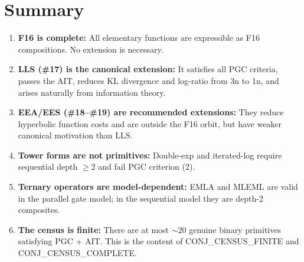 \documentclass[11pt]{article}
\begin{document}
\section{Summary}
\label{sec:summary}

\begin{enumerate}
  \item \textbf{F16 is complete:} All elementary functions are expressible as
        F16 compositions. No extension is necessary.
  \item \textbf{LLS (\#17) is the canonical extension:} It satisfies all PGC criteria,
        passes the AIT, reduces KL divergence and log-ratio from 3n to 1n,
        and arises naturally from information theory.
  \item \textbf{EEA/EES (\#18--\#19) are recommended extensions:}
        They reduce hyperbolic function costs and are outside the F16 orbit,
        but have weaker canonical motivation than LLS.
  \item \textbf{Tower forms are not primitives:} Double-exp and iterated-log
        require sequential depth $\geq 2$ and fail PGC criterion (2).
  \item \textbf{Ternary operators are model-dependent:} EMLA and MLEML are
        valid in the parallel gate model; in the sequential model they are
        depth-2 composites.
  \item \textbf{The census is finite:} There are at most $\sim 20$ genuine
        binary primitives satisfying PGC + AIT. This is the content of
        CONJ\_CENSUS\_FINITE and CONJ\_CENSUS\_COMPLETE.
\end{enumerate}
\end{document}
